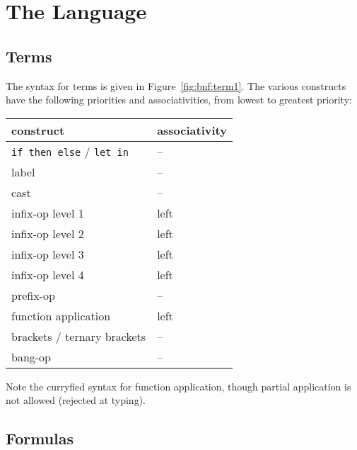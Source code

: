 \newpage


\section{The \why Language}

\subsection{Terms}

The syntax for terms is given in Figure~\ref{fig:bnf:term1}.
The various constructs have the following priorities and
associativities, from lowest to greatest priority:
\begin{center}
  \begin{tabular}{|l|l|}
    \hline
    construct & associativity \\
    \hline\hline
    \texttt{if then else} / \texttt{let in} & -- \\
    label & -- \\
    cast  & -- \\
    infix-op level 1 & left \\
    infix-op level 2 & left \\
    infix-op level 3 & left \\
    infix-op level 4 & left \\
    prefix-op     & --   \\
    function application & left \\
    brackets / ternary brackets & -- \\
    bang-op       & --   \\
    \hline
  \end{tabular}
\end{center}

Note the curryfied syntax for function application, though partial
application is not allowed (rejected at typing).

\subsection{Formulas}

